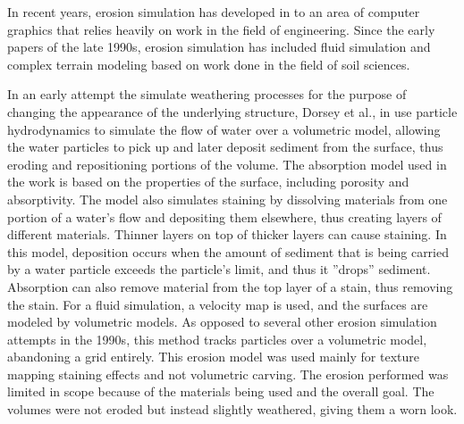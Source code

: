 % 


In recent years, erosion simulation has developed in to an area of computer graphics that relies heavily on work in the field of engineering. Since the early papers of the late 1990s, erosion simulation has included fluid simulation and complex terrain modeling based on work done in the field of soil sciences.

In an early attempt the simulate weathering processes for the purpose of changing the appearance of the underlying structure, Dorsey et al., in \cite{Dorsey-FlowAndChanges} use particle hydrodynamics to simulate the flow of water over a volumetric model, allowing the water particles to pick up and later deposit sediment from the surface, thus eroding and repositioning portions of the volume. The absorption model used in the work is based on the properties of the surface, including porosity and absorptivity. The model also simulates staining by dissolving materials from one portion of a water's flow and depositing them elsewhere, thus creating layers of different materials. Thinner layers on top of thicker layers can cause staining. In this model, deposition occurs when the amount of sediment that is being carried by a water particle exceeds the particle's limit, and thus it ''drops'' sediment. Absorption can also remove material from the top layer of a stain, thus removing the stain. For a fluid simulation, a velocity map is used, and the surfaces are modeled by volumetric models. As opposed to several other erosion simulation attempts in the 1990s, this method tracks particles over a volumetric model, abandoning a grid entirely. This erosion model was used mainly for texture mapping staining effects and not volumetric carving. The erosion performed was limited in scope because of the materials being used and the overall goal. The volumes were not eroded but instead slightly weathered, giving them a worn look.


